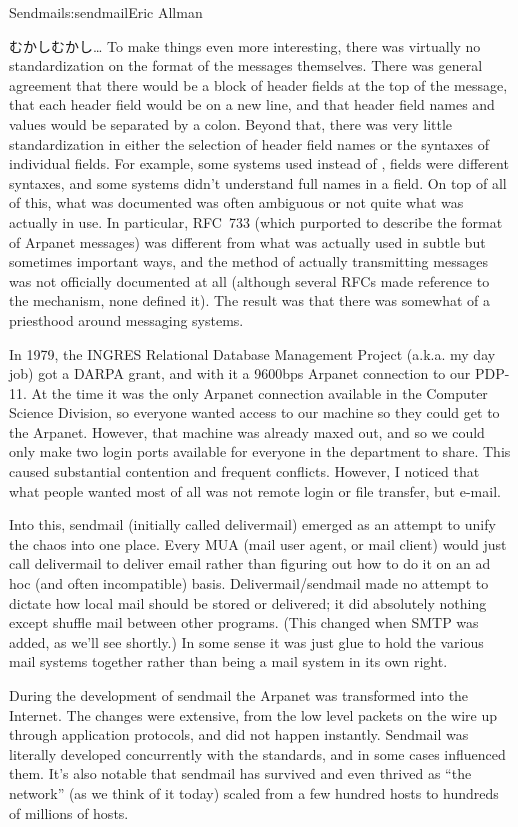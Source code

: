 \begin{aosachapter}{Sendmail}{s:sendmail}{Eric Allman}
\begin{aosasect1}{むかしむかし\ldots}
To make things even more interesting, there was virtually no
standardization on the format of the messages themselves.  There was
general agreement that there would be a block of header fields at the
top of the message, that each header field would be on a new line, and
that header field names and values would be separated by a
colon. Beyond that, there was very little standardization in either the
selection of header field names or the syntaxes of individual
fields. For example, some systems used  instead of
,  fields were different syntaxes, and some
systems didn't understand full names in a  field. On top
of all of this, what was documented was often ambiguous or not quite
what was actually in use. In particular, RFC~733 (which purported to
describe the format of Arpanet messages) was different from what was
actually used in subtle but sometimes important ways, and the method
of actually transmitting messages was not officially documented at all
(although several RFCs made reference to the mechanism, none defined
it). The result was that there was somewhat of a priesthood around
messaging systems.

In 1979, the INGRES Relational Database Management Project
(a.k.a. my day job)
got a DARPA grant, and with it a 9600bps Arpanet connection
to our PDP-11.
At the time it was the only Arpanet connection available in
the Computer Science Division,
so everyone wanted access to our machine so they could get to the Arpanet.
However, that machine was already maxed out,
and so we could only make two login ports available for everyone in the
department to share.
This caused substantial contention and frequent conflicts.
However, I noticed that what people wanted most of all was not
remote login or file transfer, but e-mail.

Into this, sendmail (initially called delivermail) emerged as an
attempt to unify the chaos into one place. Every MUA (mail user agent,
or mail client) would just call delivermail to deliver email rather than
figuring out how to do it on an ad hoc (and often incompatible) basis.
Delivermail/sendmail made no attempt to dictate how local mail should be stored or
delivered; it did absolutely nothing except shuffle mail between other
programs. (This changed when SMTP was added, as we'll see shortly.)
In some sense it was just glue to hold the various mail systems
together rather than being a mail system in its own right.

\pagebreak

During the development of sendmail the Arpanet was transformed into
the Internet. The changes were extensive, from the low level packets
on the wire up through application protocols, and did not happen
instantly.  Sendmail was literally developed concurrently with the
standards, and in some cases influenced them. It's also notable that
sendmail has survived and even thrived as ``the network'' (as we think
of it today) scaled from a few hundred hosts to hundreds of millions
of hosts.


\end{aosasect1}
\end{aosachapter}
